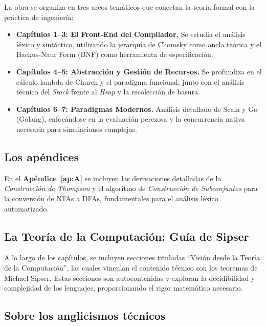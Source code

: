 La obra se organiza en tres arcos temáticos que conectan la teoría formal con la práctica de ingeniería:

\begin{itemize}
    \item \textbf{Capítulos 1--3: El Front-End del Compilador.} Se estudia el análisis léxico y sintáctico, utilizando la jerarquía de Chomsky como ancla teórica y el Backus-Naur Form (BNF) como herramienta de especificación.
    \item \textbf{Capítulos 4--5: Abstracción y Gestión de Recursos.} Se profundiza en el cálculo lambda de Church y el paradigma funcional, junto con el análisis técnico del \textit{Stack} frente al \textit{Heap} y la recolección de basura.
    \item \textbf{Capítulos 6--7: Paradigmas Modernos.} Análisis detallado de Scala y Go (Golang), enfocándose en la evaluación perezosa y la concurrencia nativa necesaria para simulaciones complejas.
\end{itemize}

\subsection*{Los apéndices}

En el \textbf{Apéndice~\ref{ap:A}} se incluyen las derivaciones detalladas de la \textit{Construcción de Thompson} y el algoritmo de \textit{Construcción de Subconjuntos} para la conversión de NFAs a DFAs, fundamentales para el análisis léxico automatizado.

\subsection*{La Teoría de la Computación: Guía de Sipser}

A lo largo de los capítulos, se incluyen secciones tituladas ``Visión desde la Teoría de la Computación'', las cuales vinculan el contenido técnico con los teoremas de Michael Sipser. Estas secciones son autocontenidas y exploran la decidibilidad y complejidad de los lenguajes, proporcionando el rigor matemático necesario.

\subsection*{Sobre los anglicismos técnicos}


